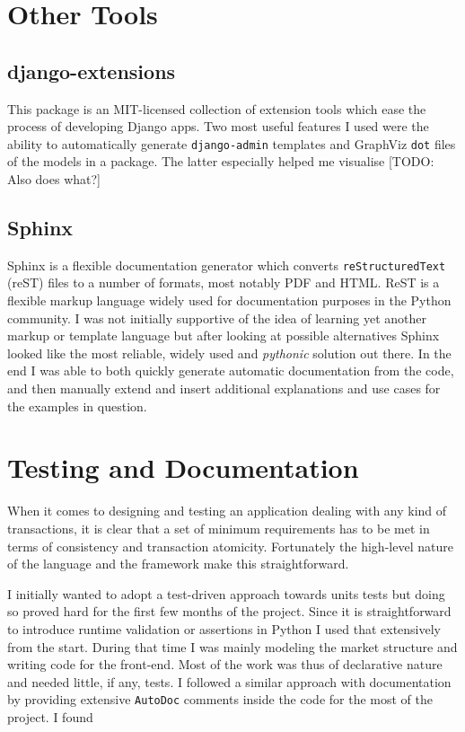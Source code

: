 \documentclass[bsc,frontabs,twoside,singlespacing,parskip,deptreport]{infthesis}     %
\begin{document}
\section{Other Tools}

\subsection{django-extensions}
    This package is an MIT-licensed collection of extension tools which ease the process of developing Django apps. Two most useful features I used were the ability to automatically generate {\tt django-admin} templates and GraphViz {\tt dot} files of the models in a package. The latter especially helped me visualise [TODO: Also does what?]

\subsection{Sphinx}
    Sphinx is a flexible documentation generator which converts {\tt reStructuredText} (reST) files to a number of formats, most notably PDF and HTML. ReST is a flexible markup language widely used for documentation purposes in the Python community. I was not initially supportive of the idea of learning yet another markup or template language but after looking at possible alternatives Sphinx looked like the most reliable, widely used and {\em pythonic} solution out there. In the end I was able to both quickly generate automatic documentation from the code, and then manually extend and insert additional explanations and use cases for the examples in question. 

\section{Testing and Documentation}
	When it comes to designing and testing an application dealing with any kind of transactions, it is clear that a set of minimum requirements has to be met in terms of consistency and transaction atomicity. Fortunately the high-level nature of the language and the framework make this straightforward. 

	I initially wanted to adopt a test-driven approach towards units tests but doing so proved hard for the first few months of the project. Since it is straightforward to introduce runtime validation or assertions in Python I used that extensively from the start. During that time I was mainly modeling the market structure and writing code for the front-end. Most of the work was thus of declarative nature and needed little, if any, tests. 
	I followed a similar approach with documentation by providing extensive {\tt AutoDoc} comments inside the code for the most of the project. I found   
\end{document}
